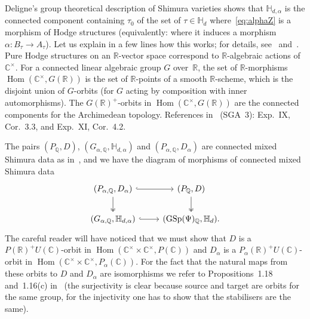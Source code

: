 \documentclass[11pt]{article}
\providecommand{\C}{}
\theoremstyle{plain}
\theoremstyle{definition}
\numberwithin{equation}{subsection}
\renewcommand{\C}{\mathbb C}
\newcommand{\R}{\mathbb R}
\newcommand{\Q}{\mathbb Q}
\renewcommand{\H}{\mathbb H}
\DeclareMathOperator{\Hom}{Hom}
\DeclareMathOperator{\GSp}{GSp}
\begin{document}
Deligne's group theoretical description of Shimura varieties shows
that $\H_{d,\alpha}$ is the connected component containing $\tau_0$ of
the set of $\tau\in\H_d$ where~\eqref{eq:alphaZ} is a morphism of
Hodge structures (equivalently: where it induces a morphism
$\alpha\colon B_\tau\to A_\tau$). Let us explain in a few lines how
this works; for details, see~\cite[\S 2.4]{Moonen-L1}
and~\cite[\S 1.1.12]{Deligne-VS}. Pure Hodge structures on an
$\R$-vector space correspond to $\R$-algebraic actions
of~$\C^\times$. For a connected linear algebraic group $G$ over~$\R$,
the set of $\R$-morphisms $\Hom(\C^\times,G(\R))$ is the set of
$\R$-points of a smooth $\R$-scheme, which is the disjoint union of
$G$\nobreakdash-orbits (for $G$ acting by composition with inner automorphisms).
The $G(\R)^+$-orbits in $\Hom(\C^\times,G(\R))$ are the connected
components for the Archimedean topology. References in~\cite{SGA3.II}
(SGA~3): Exp.~IX, Cor.~3.3, and Exp.~XI, Cor.~4.2.

The pairs $(P_\Q,D)$, $(G_{\alpha,\Q},\H_{d,\alpha})$ and
$(P_{\alpha,\Q},D_\alpha)$ are connected mixed Shimura data as
in~\cite[Def.\,2.1]{Pink1}, and we have the diagram of morphisms of
connected mixed Shimura data
\begin{equation}
\begin{tikzcd}
(P_{\alpha,\Q},D_\alpha) \ar[r, hook] \ar[d, two heads]& (P_\Q,D) \ar[d, two heads]\\
(G_{\alpha,\Q},\H_{d,\alpha}) \ar[r,hook] & (\GSp(\Psi)_\Q,\H_d).
\end{tikzcd}
\end{equation}
The careful reader will have noticed that we must show that $D$ is a
$P(\R)^+U(\C)$-orbit in $\Hom(\C^\times\times\C^\times,P(\C))$ and
$D_\alpha$ is a $P_\alpha(\R)^+U(\C)$-orbit in
$\Hom(\C^\times\times\C^\times,P_\alpha(\C))$. For the fact that the
natural maps from these orbits to $D$ and $D_\alpha$ are isomorphisms
we refer to Propositions~1.18 and~1.16(c) in~\cite{Pink_thesis} (the
surjectivity is clear because source and target are orbits for the
same group, for the injectivity one has to show that the stabilisers
are the same).
\end{document}
